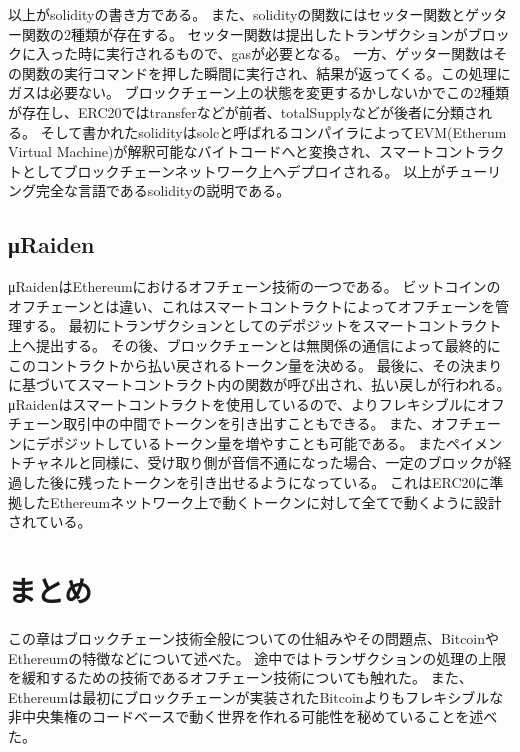 以上がsolidityの書き方である。
また、solidityの関数にはセッター関数とゲッター関数の2種類が存在する。
セッター関数は提出したトランザクションがブロックに入った時に実行されるもので、gasが必要となる。
一方、ゲッター関数はその関数の実行コマンドを押した瞬間に実行され、結果が返ってくる。この処理にガスは必要ない。
ブロックチェーン上の状態を変更するかしないかでこの2種類が存在し、ERC20ではtransferなどが前者、totalSupplyなどが後者に分類される。
そして書かれたsolidityはsolcと呼ばれるコンパイラによってEVM(Etherum Virtual Machine)が解釈可能なバイトコードへと変換され、スマートコントラクトとしてブロックチェーンネットワーク上へデプロイされる。
以上がチューリング完全な言語であるsolidityの説明である。

\subsection{μRaiden}
μRaidenはEthereumにおけるオフチェーン技術の一つである。
ビットコインのオフチェーンとは違い、これはスマートコントラクトによってオフチェーンを管理する。
最初にトランザクションとしてのデポジットをスマートコントラクト上へ提出する。
その後、ブロックチェーンとは無関係の通信によって最終的にこのコントラクトから払い戻されるトークン量を決める。
最後に、その決まりに基づいてスマートコントラクト内の関数が呼び出され、払い戻しが行われる。
μRaidenはスマートコントラクトを使用しているので、よりフレキシブルにオフチェーン取引中の中間でトークンを引き出すこともできる。
また、オフチェーンにデポジットしているトークン量を増やすことも可能である。
またペイメントチャネルと同様に、受け取り側が音信不通になった場合、一定のブロックが経過した後に残ったトークンを引き出せるようになっている。
これはERC20に準拠したEthereumネットワーク上で動くトークンに対して全てで動くように設計されている。

\section{まとめ}
この章はブロックチェーン技術全般についての仕組みやその問題点、BitcoinやEthereumの特徴などについて述べた。
途中ではトランザクションの処理の上限を緩和するための技術であるオフチェーン技術についても触れた。
また、Ethereumは最初にブロックチェーンが実装されたBitcoinよりもフレキシブルな非中央集権のコードベースで動く世界を作れる可能性を秘めていることを述べた。